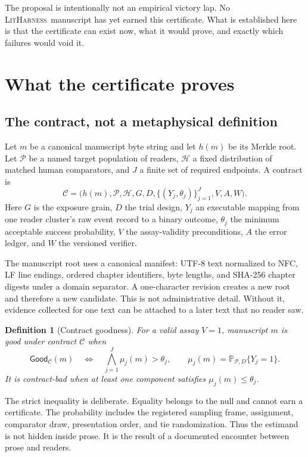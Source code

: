 \documentclass[11pt]{article}
\newtheorem{definition}{Definition}
\theoremstyle{remark}
\newcommand{\system}{\textsc{LitHarness}}
\newcommand{\good}{\mathsf{Good}}
\newcommand{\Prb}{\mathbb{P}}
\begin{document}
The proposal is intentionally not an empirical victory lap. No \system\ manuscript has yet
earned this certificate. What is established here is that the certificate can exist now,
what it would prove, and exactly which failures would void it.

\section{What the certificate proves}

\subsection{The contract, not a metaphysical definition}

Let $m$ be a canonical manuscript byte string and let $h(m)$ be its Merkle root. Let
$\mathcal P$ be a named target population of readers, $\mathcal H$ a fixed distribution of
matched human comparators, and $J$ a finite set of required endpoints. A contract is
\[
 \mathcal C = \bigl(h(m),\mathcal P,\mathcal H,G,D,
       \{(Y_j,\theta_j)\}_{j=1}^{J},V,A,W\bigr).
\]
Here $G$ is the exposure grain, $D$ the trial design, $Y_j$ an executable mapping from one
reader cluster's raw event record to a binary outcome, $\theta_j$ the minimum acceptable
success probability, $V$ the assay-validity preconditions, $A$ the error ledger, and $W$ the
versioned verifier.

The manuscript root uses a canonical manifest: UTF-8 text normalized to NFC, LF line endings,
ordered chapter identifiers, byte lengths, and SHA-256 chapter digests under a domain
separator. A one-character revision creates a new root and therefore a new candidate. This
is not administrative detail. Without it, evidence collected for one text can be attached
to a later text that no reader saw.

\begin{definition}[Contract goodness]
For a valid assay $V=1$, manuscript $m$ is good under contract $\mathcal C$ when
\[
  \good_{\mathcal C}(m)
    \quad\Longleftrightarrow\quad
  \bigwedge_{j=1}^{J} \mu_j(m)>\theta_j,
  \qquad
  \mu_j(m)=\Prb_{\mathcal P,D}\{Y_j=1\}.
\]
It is contract-bad when at least one component satisfies $\mu_j(m)\leq\theta_j$.
\end{definition}

The strict inequality is deliberate. Equality belongs to the null and cannot earn a
certificate. The probability includes the registered sampling frame, assignment,
comparator draw, presentation order, and tie randomization. Thus the estimand is not hidden
inside prose. It is the result of a documented encounter between prose and readers.
\end{document}
